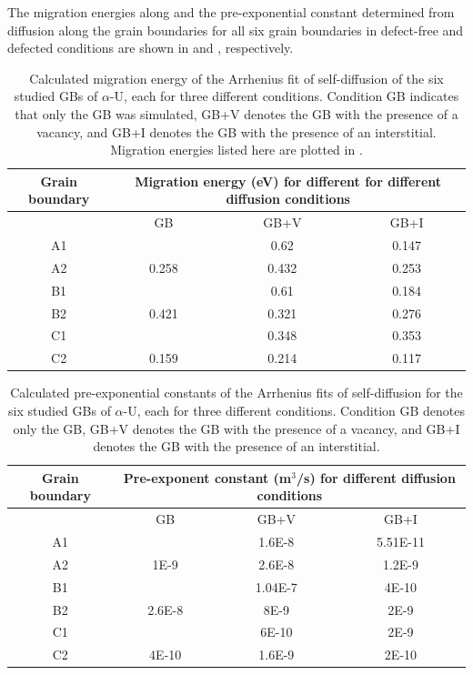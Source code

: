 \documentclass[review]{elsarticle}
\begin{document}
\FloatBarrier


The migration energies along and the pre-exponential constant determined from diffusion along the grain boundaries for all six grain boundaries in defect-free and defected conditions are shown in  and , respectively. 

{\footnotesize
\begin{table}[h!]
    \centering
    \caption{Calculated migration energy of the Arrhenius fit of self-diffusion of the six studied GBs of $\alpha$-U, each for three different conditions. Condition GB indicates that only the GB was simulated, GB+V denotes the GB with the presence of a vacancy, and GB+I denotes the GB with the presence of an interstitial. Migration energies listed here are plotted in . \label{tab:migra}}
\begin{tabular}{|c|c|c|c|}
\hline
\multicolumn{1}{|c}{Grain boundary}
& \multicolumn{3}{|c|}{Migration energy (eV) for different for different diffusion conditions} \\
\hline
 & GB & GB+V & GB+I \\
\hline
A1 &  & 0.62 & 0.147 \\
A2 & 0.258 & 0.432 & 0.253 \\
B1 &  & 0.61 & 0.184 \\
B2 & 0.421 & 0.321 & 0.276 \\
C1 &  & 0.348 & 0.353 \\
C2 & 0.159 & 0.214 & 0.117 \\
\hline
\end{tabular}
\end{table}

\begin{table}[h!]
    \centering
    \caption{Calculated pre-exponential constants of the Arrhenius fits of self-diffusion for the six studied GBs of $\alpha$-U, each for three different conditions. Condition GB denotes only the GB, GB+V denotes the GB with the presence of a vacancy, and GB+I denotes the GB with the presence of an interstitial.\label{tab:pre}}
    \begin{tabular}{|c|c|c|c|}
   \hline
\multicolumn{1}{|c}{Grain boundary}
& \multicolumn{3}{|c|}{ Pre-exponent constant (m$^3$/s) for different diffusion conditions} \\
\hline
 & GB & GB+V & GB+I \\
\hline
A1 &  & 1.6E-8 & 5.51E-11 \\
A2 & 1E-9 & 2.6E-8 & 1.2E-9 \\
B1 &  & 1.04E-7 & 4E-10 \\
B2 & 2.6E-8 & 8E-9 & 2E-9 \\
C1 &  & 6E-10 & 2E-9 \\
C2 & 4E-10 & 1.6E-9 & 2E-10 \\
\hline
    \end{tabular}
\end{table}
}
\end{document}
